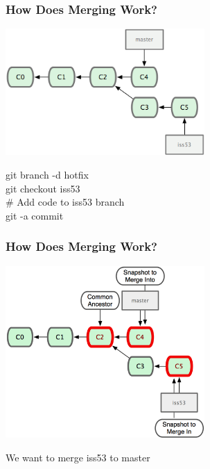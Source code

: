 \begin{frame}
\frametitle{\large How Does Merging Work?}
\begin{center}
\includegraphics[width=0.57\textwidth]{img/branching_images/f6.png}
\end{center}
\vspace{2mm}
\begin{center}
\small git branch -d hotfix \\
\small git checkout iss53 \\
\small \# Add code to iss53 branch \\
\small git -a commit
\end{center}
\end{frame}
\note{}

\begin{frame}
\frametitle{\large How Does Merging Work?}
\begin{center}
\includegraphics[width=0.57\textwidth]{img/branching_images/f7.png}
\end{center}
\vspace{2mm}
\begin{center}
We want to merge iss53 to master
\end{center}
\end{frame}
\note{}

